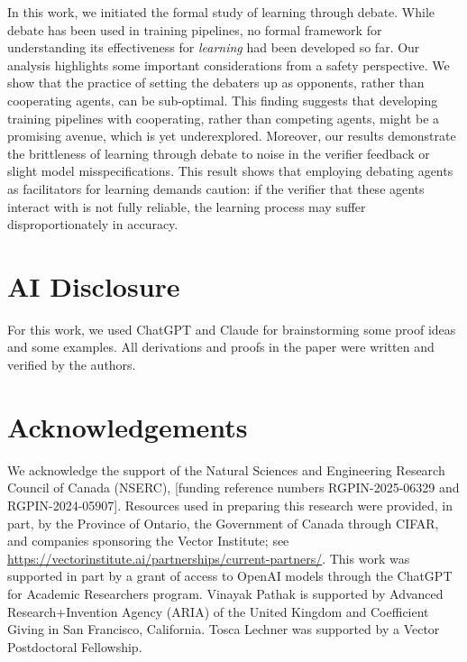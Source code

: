 \documentclass[11pt,letterpaper]{article}
\theoremstyle{definition}
\theoremstyle{plain}
\begin{document}
In this work, we initiated the formal study of learning through debate. While debate has been used in training pipelines, no formal framework for understanding its effectiveness for \emph{learning} had been developed so far. Our analysis highlights some important considerations from a safety perspective. We show that the practice of setting the debaters up as opponents, rather than cooperating agents, can be sub-optimal. 
This finding suggests that developing training pipelines with cooperating, rather than competing agents, might be a promising avenue, which is yet underexplored.
Moreover, our results demonstrate the brittleness of learning through debate to noise in the verifier feedback or slight model misspecifications. This result shows that employing debating agents as facilitators for learning demands caution: if the verifier that these agents interact with is not fully reliable, the learning process may suffer disproportionately in accuracy.

\section*{AI Disclosure}

For this work, we used ChatGPT and Claude for brainstorming some proof ideas and some examples. All derivations and proofs in the paper were written and verified by the authors.

\section*{Acknowledgements}
We acknowledge the support of the Natural Sciences and Engineering Research Council of Canada (NSERC), [funding reference numbers RGPIN-2025-06329 and RGPIN-2024-05907]. Resources used in preparing this research were provided, in part, by the Province of Ontario, the Government of Canada through CIFAR, and companies sponsoring the Vector Institute; see \url{https://vectorinstitute.ai/partnerships/current-partners/}. This work was supported in part by a grant of access to OpenAI models through the ChatGPT for Academic Researchers program. Vinayak Pathak is supported by Advanced Research+Invention Agency (ARIA) of the United Kingdom and Coefficient Giving in San Francisco, California. Tosca Lechner was supported by a Vector Postdoctoral Fellowship.




\clearpage
\appendix
\end{document}
